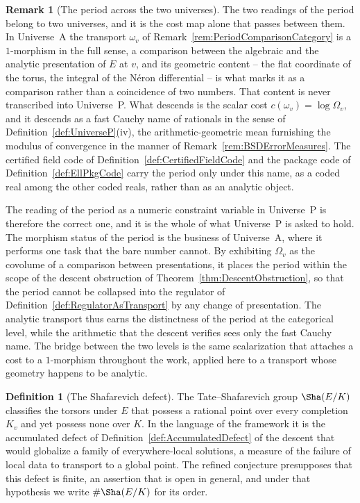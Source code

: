 \documentclass[10pt, reqno]{amsart}
\theoremstyle{plain}
\theoremstyle{definition}
\newtheorem{definition}[theorem]{Definition}
\newtheorem{remark}[theorem]{Remark}
\theoremstyle{plain}
\begin{document}
\begin{remark}[The period across the two universes]\label{rem:PeriodAcrossUniverses}
The two readings of the period belong to two universes, and it is the cost map alone that passes between them. In Universe~A the transport $\omega_v$ of Remark~\ref{rem:PeriodComparisonCategory} is a $1$-morphism in the full sense, a comparison between the algebraic and the analytic presentation of $E$ at $v$, and its geometric content -- the flat coordinate of the torus, the integral of the N\'eron differential -- is what marks it as a comparison rather than a coincidence of two numbers. That content is never transcribed into Universe~P. What descends is the scalar cost $c(\omega_v)=\log\Omega_v$, and it descends as a fast Cauchy name of rationals in the sense of Definition~\ref{def:UniverseP}\textup{(iv)}, the arithmetic-geometric mean furnishing the modulus of convergence in the manner of Remark~\ref{rem:BSDErrorMeasures}. The certified field code of Definition~\ref{def:CertifiedFieldCode} and the package code of Definition~\ref{def:EllPkgCode} carry the period only under this name, as a coded real among the other coded reals, rather than as an analytic object.

The reading of the period as a numeric constraint variable in Universe~P is therefore the correct one, and it is the whole of what Universe~P is asked to hold. The morphism status of the period is the business of Universe~A, where it performs one task that the bare number cannot. By exhibiting $\Omega_v$ as the covolume of a comparison between presentations, it places the period within the scope of the descent obstruction of Theorem~\ref{thm:DescentObstruction}, so that the period cannot be collapsed into the regulator of Definition~\ref{def:RegulatorAsTransport} by any change of presentation. The analytic transport thus earns the distinctness of the period at the categorical level, while the arithmetic that the descent verifies sees only the fast Cauchy name. The bridge between the two levels is the same scalarization that attaches a cost to a $1$-morphism throughout the work, applied here to a transport whose geometry happens to be analytic.
\end{remark}

\begin{definition}[The Shafarevich defect]\label{def:ShafarevichDefect}
The Tate--Shafarevich group $\Sha(E/K)$ classifies the torsors under $E$ that possess a rational point over every completion $K_v$ and yet possess none over $K$. In the language of the framework it is the accumulated defect of Definition~\ref{def:AccumulatedDefect} of the descent that would globalize a family of everywhere-local solutions, a measure of the failure of local data to transport to a global point. The refined conjecture presupposes that this defect is finite, an assertion that is open in general, and under that hypothesis we write $\# \Sha(E/K)$ for its order.
\end{definition}
\end{document}
